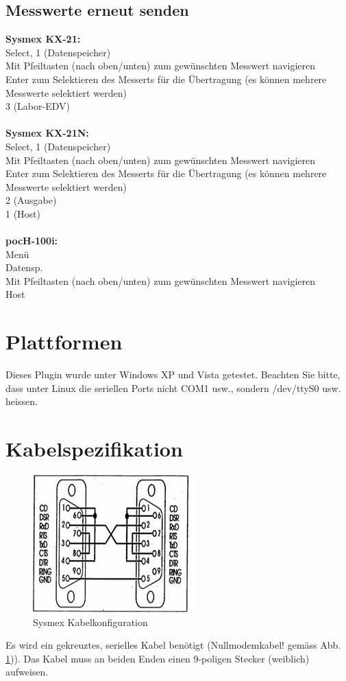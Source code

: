\documentclass[a4paper]{scrartcl}
\begin{document}
\subsection{Messwerte erneut senden}
\textbf{Sysmex KX-21:}\\
Select, 1 (Datenspeicher)\\
Mit Pfeiltasten (nach oben/unten) zum gew\"unschten Messwert navigieren\\
Enter zum Selektieren des Messerts f\"ur die \"Ubertragung (es k\"onnen mehrere Messwerte selektiert werden)\\
3 (Labor-EDV)\\
\\
\textbf{Sysmex KX-21N:}\\
Select, 1 (Datenspeicher)\\
Mit Pfeiltasten (nach oben/unten) zum gew\"unschten Messwert navigieren\\
Enter zum Selektieren des Messerts f\"ur die \"Ubertragung (es k\"onnen mehrere Messwerte selektiert werden)\\
2 (Ausgabe)\\
1 (Host)\\
\\
\textbf{pocH-100i:}\\
Men\"u\\
Datensp.\\
Mit Pfeiltasten (nach oben/unten) zum gew\"unschten Messwert navigieren\\
Host\\
\section{Plattformen}
Dieses Plugin wurde unter Windows XP und Vista getestet. Beachten Sie bitte, dass unter Linux die seriellen Ports nicht COM1 usw., sondern /dev/ttyS0 usw. heissen.
\section{Kabelspezifikation}
\begin{figure}[h]
    \centering
    \includegraphics{kabel}
    \caption{Sysmex Kabelkonfiguration}
    \label{fig:kabel}
\end{figure}
Es wird ein gekreuztes, serielles Kabel ben\"otigt (Nullmodemkabel! gem\"ass Abb. \ref{fig:kabel})). Das Kabel muss an beiden Enden einen 9-poligen Stecker (weiblich) aufweisen.
\end{document}
